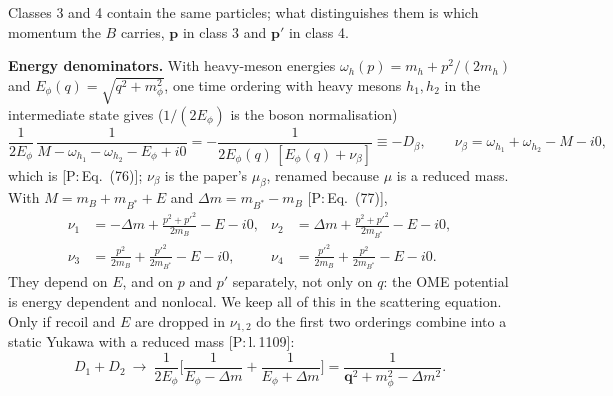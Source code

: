 \documentclass[11pt]{article}
\newcommand{\tagP}[1]{\textcolor{blue!65!black}{\textsf{\small[P:\,#1]}}}
\newenvironment{aiadd}{\par}{\par}
\begin{document}
\begin{aiadd}
\begin{center}
	\end{center}
	Classes 3 and 4 contain the same particles; what distinguishes them is which momentum the $B$ carries, $\bm p$ in class 3 and $\bm p'$ in class 4.

	\textbf{Energy denominators.} With heavy-meson energies $\omega_h(p)=m_h+p^2/(2m_h)$ and $E_\phi(q)=\sqrt{q^2+m_\phi^2}$, one time ordering with heavy mesons $h_1,h_2$ in the intermediate state gives ($1/(2E_\phi)$ is the boson normalisation)
	\[
		\frac{1}{2E_\phi}\,\frac{1}{M-\omega_{h_1}-\omega_{h_2}-E_\phi+i0}=-\frac{1}{2E_\phi(q)\,[E_\phi(q)+\nu_\beta]}\equiv-D_\beta,\qquad
		\nu_\beta=\omega_{h_1}+\omega_{h_2}-M-i0,
	\]
	which is \tagP{Eq.~(76)}; $\nu_\beta$ is the paper's $\mu_\beta$, renamed because $\mu$ is a reduced mass. With $M=m_B+m_{B^*}+E$ and $\Delta m=m_{B^*}-m_B$ \tagP{Eq.~(77)},
	\begin{align*}
		\nu_1 & =-\Delta m+\frac{p^2+p'^2}{2m_B}-E-i0,        & \nu_2 & =\Delta m+\frac{p^2+p'^2}{2m_{B^*}}-E-i0,     \\
		\nu_3 & =\frac{p^2}{2m_B}+\frac{p'^2}{2m_{B^*}}-E-i0, & \nu_4 & =\frac{p'^2}{2m_B}+\frac{p^2}{2m_{B^*}}-E-i0.
	\end{align*}
	They depend on $E$, and on $p$ and $p'$ separately, not only on $q$: the OME potential is energy dependent and nonlocal. We keep all of this in the scattering equation. Only if recoil and $E$ are dropped in $\nu_{1,2}$ do the first two orderings combine into a static Yukawa with a reduced mass \tagP{l.\,1109}:
	\[
		D_1+D_2\ \to\ \frac{1}{2E_\phi}\Big[\frac{1}{E_\phi-\Delta m}+\frac{1}{E_\phi+\Delta m}\Big]=\frac{1}{\bm q^2+m_\phi^2-\Delta m^2}.
	\]


\end{aiadd}
\end{document}
